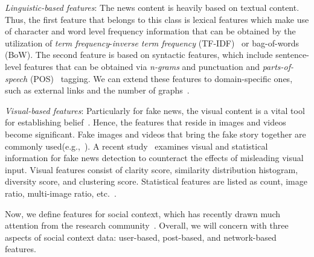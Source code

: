 \begin{description}
    \item{\emph{Linguistic-based features}:} The news content is heavily based on textual content. Thus, the first feature that belongs to this class is lexical features which make use of character and word level frequency information that can be obtained by the utilization of \emph{term frequency}-\emph{inverse term frequency} (TF-IDF)~\parencite{TF_Luhn, IDF_Jones} or bag-of-words (BoW). The second feature is based on syntactic features, which include sentence-level features that can be obtained via \emph{n-grams} and punctuation and \emph{parts-of-speech} (POS)~\parencite{POS_Daelemans} tagging. We can extend these features to domain-specific ones, such as external links and the number of graphs~\parencite{AStylometricInquiry_Potthast}.
    \item{\emph{Visual-based features}:} Particularly for fake news, the visual content is a vital tool for establishing
    belief~\parencite{VisualMisAndDisinformation_Viorela}. Hence, the features that reside in images and videos become significant. Fake images and videos that bring the fake story together are commonly used(e.g.,~\cite{PutinBehindBars_Harding, DeepFakeQueensSpeech_Sawer}). A recent study~\parencite{ExploitingMultiDomainVisualInformation_Qi} examines visual and statistical information for fake news detection to counteract the effects of misleading visual input. Visual features consist of clarity score, similarity distribution histogram, diversity score, and clustering score. Statistical features are listed
    as count, image ratio, multi-image ratio, etc.~\parencite{FakeNewsDetectionOnSocialMediaADataMiningPerspective_Shu}.
\end{description}
Now, we define features for social context, which has recently drawn much attention from the research community~\parencite{BeyondNewsContents_Shu, HierarchicalPropagationNetworksForFND_Shu}. Overall, we will concern with three aspects of social context data: user-based, post-based, and network-based features.
